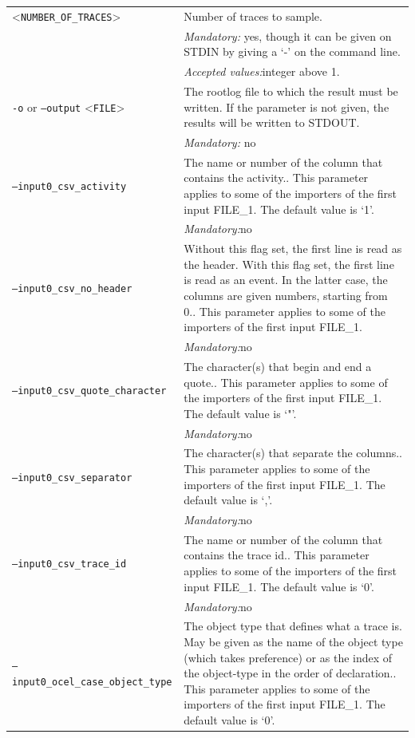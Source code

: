 {\begin{tabularx}{\linewidth}{lX}
<\texttt{NUMBER\_OF\_TRACES}>&Number of traces to sample.\\
&\textit{Mandatory:} \quad yes, though it can be given on STDIN by giving a `-' on the command line.\\
&\textit{Accepted values:}\quad integer above 1.\\
\texttt{-o} or \texttt{--output} <\texttt{FILE}> &
The rootlog file to which the result must be written. If the parameter is not given, the results will be written to STDOUT.\\
&\textit{Mandatory:} \quad no\\
\texttt{--input0\_csv\_activity} & The name or number of the column that contains the activity.. This parameter applies to some of the importers of the first input FILE\_1. The default value is `1'.\\
&\textit{Mandatory:}\quad no\\
\texttt{--input0\_csv\_no\_header} & Without this flag set, the first line is read as the header. 
    With this flag set, the first line is read as an event. In the latter case, the columns are given numbers, starting from 0.. This parameter applies to some of the importers of the first input FILE\_1. \\
&\textit{Mandatory:}\quad no\\
\texttt{--input0\_csv\_quote\_character} & The character(s) that begin and end a quote.. This parameter applies to some of the importers of the first input FILE\_1. The default value is `"'.\\
&\textit{Mandatory:}\quad no\\
\texttt{--input0\_csv\_separator} & The character(s) that separate the columns.. This parameter applies to some of the importers of the first input FILE\_1. The default value is `,'.\\
&\textit{Mandatory:}\quad no\\
\texttt{--input0\_csv\_trace\_id} & The name or number of the column that contains the trace id.. This parameter applies to some of the importers of the first input FILE\_1. The default value is `0'.\\
&\textit{Mandatory:}\quad no\\
\texttt{--input0\_ocel\_case\_object\_type} & The object type that defines what a trace is. May be given as the name of the object type (which takes preference) or as the index of the object-type in the order of declaration.. This parameter applies to some of the importers of the first input FILE\_1. The default value is `0'.\\

\end{tabularx}}
